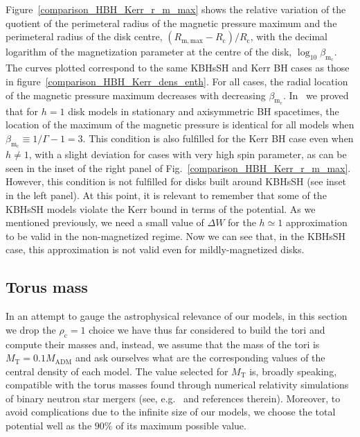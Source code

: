 \documentclass[twocolumn,aps,showpacs,showkeys,prd,superscriptaddress,byrevtex, amsmath]{revtex4-1}
\begin{document}
Figure~\ref{comparison_HBH_Kerr_r_m_max} shows the relative variation of the quotient of the perimeteral radius of the magnetic pressure maximum and the perimeteral radius of the disk centre, $(R_{\mathrm{m, max}}-R_{\mathrm{c}})/R_{\mathrm{c}}$, with the decimal logarithm of the magnetization parameter at the centre of the disk, $\log_{10} \beta_{\mathrm{m_c}}$. The curves plotted correspond to the same KBHsSH and Kerr BH cases as those in figure~\ref{comparison_HBH_Kerr_dens_enth}. For all cases, the radial location of the magnetic pressure maximum decreases with decreasing $\beta_{\mathrm{m_c}}$. In~\cite{Gimeno-Soler:2017} we proved that for $h=1$ disk models in stationary and axisymmetric BH spacetimes, the location of the maximum of the magnetic pressure is identical for all models when $\beta_{\mathrm{m_c}}\equiv 1 / \Gamma - 1=3$. This condition is also fulfilled for the Kerr BH case  even when $h \neq 1$, with a slight deviation for cases with very high spin parameter,  as can be seen in the inset of the right panel of Fig.~\ref{comparison_HBH_Kerr_r_m_max}.  However, this condition is not fulfilled for disks built around KBHsSH (see inset in the left panel). At this point, it is relevant to remember that some of the KBHsSH models violate the Kerr bound in terms of the potential. As we mentioned previously, we need a small value of $\Delta W$ for the $h \simeq 1$ approximation to be valid in the non-magnetized regime. Now we can see that, in the KBHsSH case, this approximation is not valid even for mildly-magnetized disks.

\subsection{Torus mass}

In an attempt to gauge the astrophysical relevance of our models, in this section we drop the $\rho_{\mathrm{c}} = 1$ choice we have thus far considered to build the tori and compute their masses and, instead, we assume that the mass of the tori is $M_{\mathrm{T}} = 0.1 M_{\mathrm{ADM}}$ and ask ourselves what are the corresponding values of the central density of each model. The value selected for $M_{\mathrm{T}}$ is, broadly speaking, compatible with the torus masses found through numerical relativity simulations of binary neutron star mergers (see, e.g.~\cite{Rezzolla:2010, Rezzolla:2017} and references therein). Moreover, to avoid complications due to the infinite size of our models, we choose the total potential well as the $90\%$ of its maximum possible value.
\end{document}
